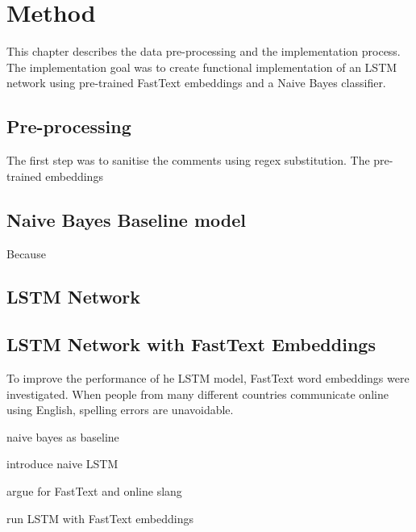 \chapter{Method}
This chapter describes the data pre-processing and the implementation
process. The implementation goal was to create functional
implementation of an LSTM network using pre-trained FastText embeddings and a
Naive Bayes classifier.

\section{Pre-processing}
The first step was to sanitise the comments using regex
substitution. The pre-trained embeddings 

\section{Naive Bayes Baseline model}
Because 

\section{LSTM Network}

\section{LSTM Network with FastText Embeddings}
To improve the performance of he LSTM model, FastText word embeddings
were investigated. When people from many different countries
communicate online using English, spelling errors are unavoidable.  

naive bayes as baseline

introduce naive LSTM

argue for FastText and online slang

run LSTM with FastText embeddings
